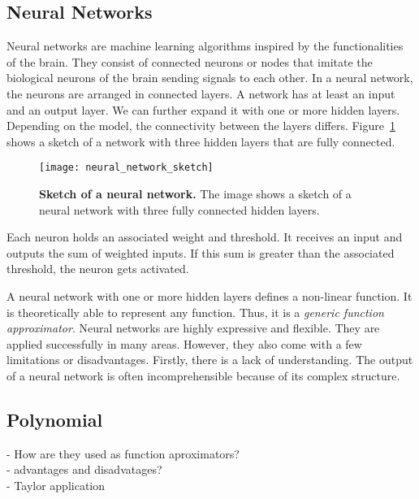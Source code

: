 \subsection{Neural Networks}
Neural networks are machine learning algorithms inspired by the functionalities of the brain. They consist of connected neurons or nodes that imitate the biological neurons of the brain sending signals to each other. In a neural network, the neurons are arranged in connected layers. A network has at least an input and an output layer. We can further expand it with one or more hidden layers. Depending on the model, the connectivity between the layers differs. Figure~\ref{fig:neural_network_sketch} shows a sketch of a network with three hidden layers that are fully connected.
\begin{figure}[ht]
\centering
\texttt{[image: neural\_network\_sketch]}
\caption[Sketch of a Neural Network]{
  \textbf{Sketch of a neural network.}
  The image shows a sketch of a neural network with three fully connected hidden layers.
}
\label{fig:neural_network_sketch}
\end{figure}
Each neuron holds an associated weight and threshold. It receives an input and outputs the sum of weighted inputs. If this sum is greater than the associated threshold, the neuron gets activated.

A neural network with one or more hidden layers defines a non-linear function. It is theoretically able to represent any function. Thus, it is a \textit{generic function approximator}. Neural networks are highly expressive and flexible. They are applied successfully in many areas. However, they also come with a few limitations or disadvantages. Firstly, there is a lack of understanding. The output of a neural network is often incomprehensible because of its complex structure.




\subsection{Polynomial}
- How are they used as function aproximators? \\


- advantages and disadvatages? \\


- Taylor application \\

